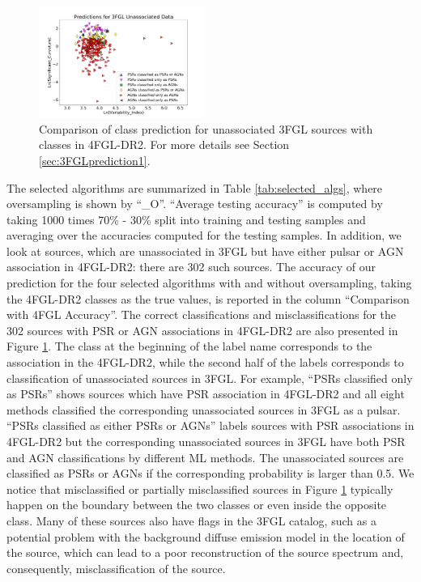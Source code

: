 \begin{figure}[h]
\centering
\includegraphics[width=0.48\textwidth]{plots/3FGL_unassoc_vs_4FGL-DR2_assoc.pdf}
\caption{Comparison of class prediction for unassociated 3FGL sources with classes in 4FGL-DR2. 
For more details see Section \ref{sec:3FGLprediction1}.}
\label{fig:3FGL_vs_4FGL_classes}
\end{figure}

The selected algorithms are summarized in Table \ref{tab:selected_algs}, where oversampling is shown by ``\_O''.
``Average testing accuracy'' is computed by taking 1000 times 70\% - 30\% split into training and testing samples and averaging over the 
accuracies computed for the testing samples.
In addition, we look at sources, which are unassociated in 3FGL but have either pulsar or AGN association in 4FGL-DR2: there are 302 such sources.
The accuracy of our prediction for the four selected algorithms with and without oversampling, taking the 4FGL-DR2 classes as the true values, is reported in the column ``Comparison with 4FGL Accuracy''.
The correct classifications and misclassifications for the 302 sources with PSR or AGN associations in 4FGL-DR2 are also presented in Figure \ref{fig:3FGL_vs_4FGL_classes}.
The class at the beginning of the label name corresponds to the association in the 4FGL-DR2, while the second half of the labels corresponds to classification of unassociated sources in 3FGL. For example, ``PSRs classified only as PSRs'' shows sources which have PSR association in 4FGL-DR2 and all eight methods classified the corresponding unassociated sources in 3FGL as a pulsar. ``PSRs classified as either PSRs or AGNs'' labels sources with PSR associations in 4FGL-DR2 but the corresponding unassociated sources in 3FGL have both PSR and AGN classifications by different ML methods.
The unassociated sources are classified as PSRs or AGNs if the corresponding probability is larger than 0.5.
We notice that misclassified or partially misclassified sources in Figure \ref{fig:3FGL_vs_4FGL_classes} typically happen on the boundary between the two classes or even inside the opposite class.
Many of these sources also have flags in the 3FGL catalog, such as a potential problem with the background diffuse emission model in the location of the source, which can lead to a poor reconstruction of the source spectrum and, consequently, misclassification of the source.


